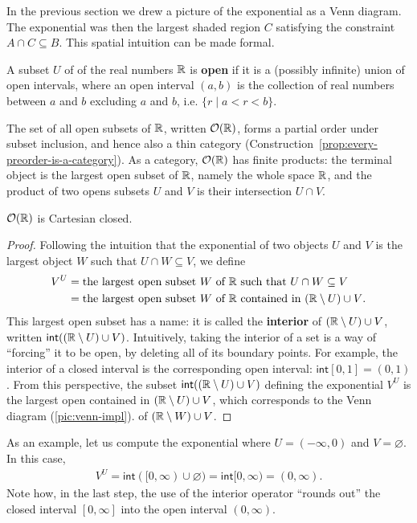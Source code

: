 In the previous section we drew a picture of the exponential as a Venn diagram.  The
exponential was then the largest shaded region \(C\) satisfying the constraint
\(A \cap C \subseteq B\).  This spatial intuition can be made formal.

\begin{definition}
  \sloppy
  A subset \(U\) of of the real numbers \(\mathbb R\) is \textbf{open}
  if it is a (possibly infinite) union of open intervals, where an open interval
  $(a, b)$ is the collection of real numbers between $a$ and $b$
  excluding $a$ and $b$, i.e.  $\{r \mid a < r < b\}$.
\end{definition}

The set of all open subsets of \(\mathbb R\), written \(\mathcal O(\mathbb R)\),
forms a partial order under subset inclusion,
and hence also a thin category (Construction~\ref{prop:every-preorder-is-a-category}).
As a category, \(\mathcal O(\mathbb R)\) has finite products:
the terminal object is the largest open subset of \(\mathbb R\),
namely the whole space \(\mathbb R\),
and the product of two opens subsets \(U\) and \(V\)
is their intersection \(U\cap V\).

\begin{proposition}
  \(\mathcal O(\mathbb R)\) is Cartesian closed.
\end{proposition}
\begin{proof}
  Following the intuition that the exponential of two objects \(U\) and \(V\)
  is the largest object \(W\) such that \(U\cap W \subseteq V\),
  we define
  \begin{align}
  V^U &= \text{the largest open subset \(W\) of \(\mathbb R\) such that \(U\cap W\subseteq V\)} \\
      &= \text{the largest open subset \(W\) of \(\mathbb R\) contained in \((\mathbb R\setminus U) \cup V\)}.
  \end{align}
  This largest open subset has a name: it is called the
  \textbf{interior} of \((\mathbb R\setminus U) \cup V\),
  written \(\mathsf{int}((\mathbb R\setminus U) \cup V)\).
  Intuitively, taking the interior of a set is a way of ``forcing'' it to be open,
  by deleting all of its boundary points. For example, the interior of a closed interval is the corresponding
  open interval: \(\mathsf{int}[0,1] = (0,1)\).
  From this perspective, the subset \(\mathsf{int}((\mathbb R\setminus U) \cup V)\) defining the exponential \(V^U\)
  is the largest open contained in \((\mathbb R\setminus U) \cup V\), which corresponds to the Venn diagram (\ref{pic:venn-impl}).
  of \((\mathbb R\setminus W) \cup V\).
\end{proof}
As an example, let us compute the exponential where \(U = (-\infty,0)\) and \(V=\varnothing\).
In this case,
\begin{align}
  V^U = \mathsf{int}([0,\infty) \cup \varnothing)
      = \mathsf{int}[0,\infty)
      = (0,\infty).
\end{align}
Note how, in the last step, the use of the interior operator ``rounds out'' the closed interval \([0,\infty]\)
into the open interval \((0,\infty)\).


